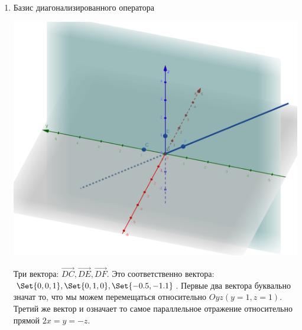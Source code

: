 \begin{enumerate}
\begin{enumerate}
        \item Базис диагонализированного оператора

        \includegraphics[scale=0.2]{images/3a5}

        Три вектора: $\overrightarrow{DC}, \overrightarrow{DE}, \overrightarrow{DF}$.
        Это соответственно вектора: $\Set{0,0,1}, \Set{0,1,0}, \Set{-0.5,-1.1}$. Первые два вектора буквально значат то, что мы можем перемещаться относительно $Oyz (y = 1, z = 1)$. Третий же вектор и означает то самое параллельное отражение относительно прямой $2x=y=-z$.

    \end{enumerate}

\end{enumerate}